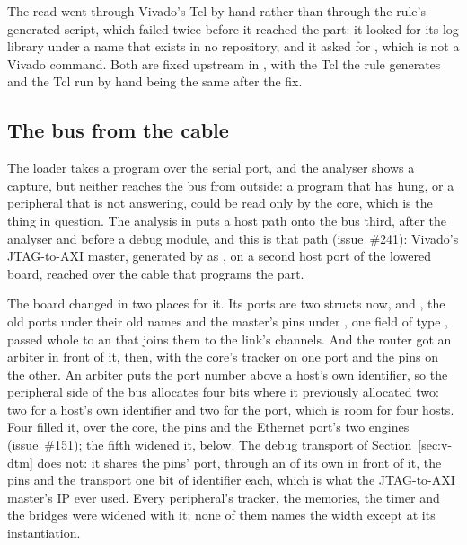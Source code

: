 \documentclass[journal,onecolumn,9pt]{IEEEtran}
\begin{document}
The read went through Vivado's Tcl by hand rather than through the
rule's generated script, which failed twice before it reached the
part: it looked for its log library under a name that exists in no
repository, and it asked for , which is not a
Vivado command. Both are fixed upstream in
, with the Tcl the rule generates and the
Tcl run by hand being the same after the fix.



\subsection{The bus from the cable}
\label{sec:v-jtag}

The loader takes a program over the serial port, and the analyser
shows a capture, but neither reaches the bus from outside: a program
that has hung, or a peripheral that is not answering, could be read
only by the core, which is the thing in question. The analysis in
 puts a host path onto the bus third,
after the analyser and before a debug module, and this is that path
(issue~\#241): Vivado's JTAG-to-AXI master, generated by
 as , on a second host
port of the lowered board, reached over the cable that programs the
part.

The board changed in two places for it. Its ports are two structs
now,  and , the old ports under their old
names and the master's pins under , one field of type
, passed whole to an  that joins them
to the link's channels. And the router got an arbiter in
front of it,  then, with the core's tracker on one port
and the pins on the other. An arbiter puts the port number above a
host's own identifier, so the peripheral side of the bus allocates four
bits where it previously allocated two: two for a host's own identifier and two for the port,
which is room for four hosts. Four filled it,  over
the core, the pins and the Ethernet port's two engines
(issue~\#151); the fifth widened it, below. The debug
transport of Section~\ref{sec:v-dtm} does not: it shares the pins'
port, through an  of its own in front of it, the pins
and the transport one bit of identifier each, which is what the
JTAG-to-AXI master's IP ever used. Every peripheral's
tracker, the memories, the timer and the bridges were widened with
it; none of them names the width except at its instantiation.
\end{document}

